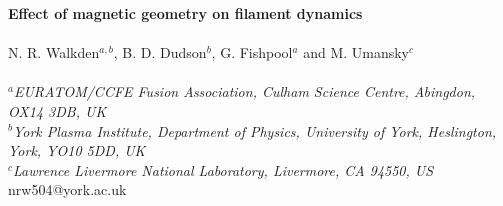 \documentclass[12pt]{article}
\begin{document}
\pagestyle{empty}
\parindent=0mm
\parskip=0mm

\begin{center}
{\large\bfseries Effect of magnetic geometry on filament dynamics}\\
~\\
N. R. Walkden${}^{a,b}$, B. D. Dudson${}^{b}$, G. Fishpool${}^{a}$ and M. Umansky${}^{c}$\\
~\\
{\small\itshape
{\footnotesize ${}^{a}$EURATOM/CCFE Fusion Association, Culham Science Centre, Abingdon, OX14 3DB, UK\\
${}^{b}$York Plasma Institute, Department of Physics, University of York, Heslington, York, YO10 5DD, UK\\
${}^{c}$Lawrence Livermore National Laboratory, Livermore, CA 94550, US}}
~\\
{\small nrw504@york.ac.uk}%
\end{center}
\end{document}

